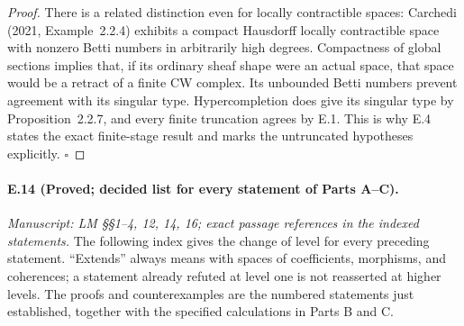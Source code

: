 \begin{proof}
There is a related distinction even for locally contractible spaces: Carchedi (2021, Example~2.2.4) exhibits a compact Hausdorff locally contractible space with nonzero Betti numbers in arbitrarily high degrees. Compactness of global sections implies that, if its ordinary sheaf shape were an actual space, that space would be a retract of a finite CW complex. Its unbounded Betti numbers prevent agreement with its singular type. Hypercompletion does give its singular type by Proposition~2.2.7, and every finite truncation agrees by E.1. This is why E.4 states the exact finite-stage result and marks the untruncated hypotheses explicitly. \hfill$\square$
\end{proof}

\paragraph{E.14 (Proved; decided list for every statement of Parts A--C).}
\textit{Manuscript: LM \S\S1--4, 12, 14, 16; exact passage references in the indexed statements.}
The following index gives the change of level for every preceding statement. ``Extends'' always means with spaces of coefficients, morphisms, and coherences; a statement already refuted at level one is not reasserted at higher levels. The proofs and counterexamples are the numbered statements just established, together with the specified calculations in Parts B and C.

